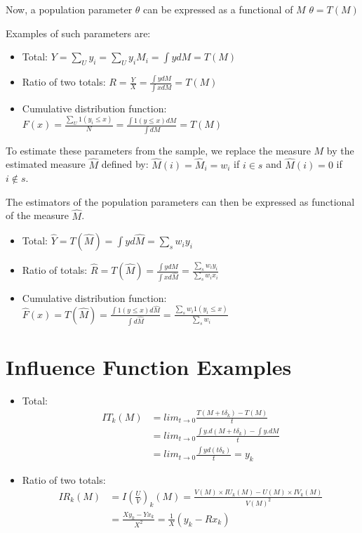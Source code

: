 \documentclass[
]{book}
\begin{document}
Now, a population parameter \(\theta\) can be expressed as a functional of \(M\)
\(\theta=T(M)\)

Examples of such parameters are:

\begin{itemize}
\item
  Total:
  \(Y=\sum_Uy_i=\sum_U y_iM_i=\int ydM=T(M)\)
\item
  Ratio of two totals:
  \(R=\frac{Y}{X}=\frac{\int y dM}{\int x dM}=T(M)\)
\item
  Cumulative distribution function:
  \(F(x)=\frac{\sum_U 1(y_i\leq x)}{N}=\frac{\int 1(y\leq x)dM}{\int{dM}}=T(M)\)
\end{itemize}

To estimate these parameters from the sample, we replace the measure \(M\) by the estimated measure \(\hat{M}\) defined by: \(\hat{M}(i)=\hat{M}_i= w_i\) if \(i\in s\) and \(\hat{M}(i)=0\) if \(i\notin s\).

The estimators of the population parameters can then be expressed as functional of the measure \(\hat{M}\).

\begin{itemize}
\item
  Total:
  \(\hat{Y}=T(\hat{M})=\int yd\hat{M}=\sum_s w_iy_i\)
\item
  Ratio of totals:
  \(\hat{R}=T(\hat{M})=\frac{\int y d\hat{M}}{\int x d\hat{M}}=\frac{\sum_s w_iy_i}{\sum_s w_ix_i}\)
\item
  Cumulative distribution function:
  \(\hat{F}(x)=T(\hat{M})=\frac{\int 1(y\leq x)d\hat{M}}{\int{d\hat{M}}}=\frac{\sum_s w_i 1(y_i\leq x)}{\sum_s w_i}\)
\end{itemize}

\hypertarget{influence-function-examples}{%
\section{Influence Function Examples}\label{influence-function-examples}}

\begin{itemize}
\item
  Total:
  \[
  \begin{aligned}
  IT_k(M)&=lim_{t\rightarrow 0}\frac{T(M+t\delta_k)-T(M)}{t}\\
  &=lim_{t\rightarrow 0}\frac{\int y.d(M+t\delta_k)-\int y.dM}{t}\\
  &=lim_{t\rightarrow 0}\frac{\int yd(t\delta_k)}{t}=y_k  
  \end{aligned}
  \]
\item
  Ratio of two totals:
  \[
  \begin{aligned}
  IR_k(M)&=I\left(\frac{U}{V}\right)_k(M)=\frac{V(M)\times IU_k(M)-U(M)\times IV_k(M)}{V(M)^2}\\
  &=\frac{X y_k-Y x_k}{X^2}=\frac{1}{X}(y_k-Rx_k)
  \end{aligned}
  \]
\end{itemize}
\end{document}
